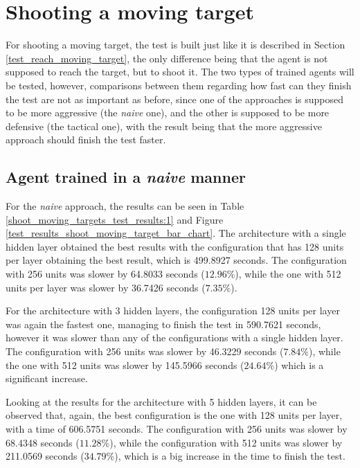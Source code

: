\section{Shooting a moving target} \label{test_shoot_moving_target}

For shooting a moving target, the test is built just like it is described in Section \ref{test_reach_moving_target}, the only difference being that the agent is not supposed to reach the target, but to shoot it. The two types of trained agents will be tested, however, comparisons between them regarding how fast can they finish the test are not as important as before, since one of the approaches is supposed to be more aggressive (the \emph{naive} one), and the other is supposed to be more defensive (the tactical one), with the result being that the more aggressive approach should finish the test faster.

\subsection{Agent trained in a \emph{naive} manner}

For the \emph{naive} approach, the results can be seen in Table \ref{shoot_moving_targets_test_results:1} and Figure \ref{test_results_shoot_moving_target_bar_chart}. The architecture with a single hidden layer obtained the best results with the configuration that has 128 units per layer obtaining the best result, which is 499.8927 seconds. The configuration with 256 units was slower by 64.8033 seconds ($12.96\%$), while the one with 512 units per layer was slower by 36.7426 seconds ($7.35\%$).

For the architecture with 3 hidden layers, the configuration 128 units per layer was again the fastest one, managing to finish the test in 590.7621 seconds, however it was slower than any of the configurations with a single hidden layer. The configuration with 256 units was slower by 46.3229 seconds ($7.84\%$), while the one with 512 units was slower by 145.5966 seconds ($24.64\%$) which is a significant increase.

Looking at the results for the architecture with 5 hidden layers, it can be observed that, again, the best configuration is the one with 128 units per layer, with a time of 606.5751 seconds. The configuration with 256 units was slower by 68.4348 seconds ($11.28\%$), while the configuration with 512 units was slower by 211.0569 seconds ($34.79\%$), which is a big increase in the time to finish the test.


